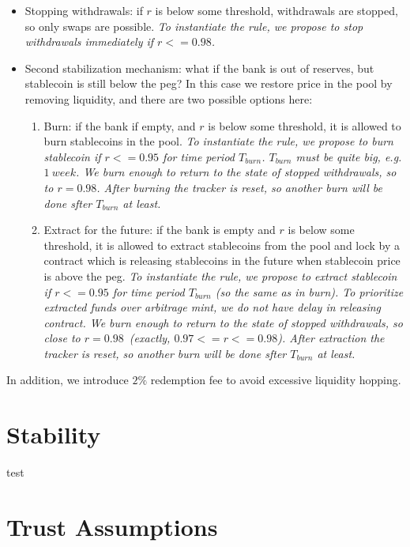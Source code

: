 \documentclass[a4paper,UKenglish,cleveref, autoref, thm-restate]{lipics-v2021}
\newcommand{\sct}{stablecoin}
\begin{document}
\begin{itemize}
   \item{Stopping withdrawals: } if $r$ is below some threshold, withdrawals are stopped, so only swaps are possible.  
   \em{To instantiate the rule, we propose to stop withdrawals immediately if $r <= 0.98$.}

   \item{Second stabilization mechanism: } what if the bank is out of reserves, but \sct{} is still below the peg? In this case we restore price in the pool by removing liquidity, and there are two possible options here:

   \begin{enumerate}
   \item{Burn: } if the bank if empty, and $r$ is below some threshold, it is allowed to burn \sct{}s in the pool. 
   \em{To instantiate the rule, we propose to burn \sct{} if $r <= 0.95$ for time period $T_{burn}$. $T_{burn}$ must be quite big, e.g. $1 {\ week}$. We burn enough to return to the state of stopped withdrawals, so to $r = 0.98$. After burning the tracker is reset, so another burn will be done sfter $T_{burn}$ at least.}

   \item{Extract for the future: } if the bank is empty and $r$ is below some threshold, it is allowed to extract \sct{}s from the pool and lock by a contract which is releasing \sct{}s in the future when \sct{} price is above the peg.
   \em{To instantiate the rule, we propose to extract \sct{} if $r <= 0.95$ for time period $T_{burn}$ (so the same as in burn). 
   To prioritize extracted funds over arbitrage mint, we do not have delay in releasing contract. We burn enough to return to the state of stopped withdrawals, so close to $r = 0.98$~(exactly, $0.97 <= r <= 0.98$). After extraction the tracker is reset, so another burn will be done sfter $T_{burn}$ at least.}
   \end{enumerate}
\end{itemize} 

In addition, we introduce $2\%$ redemption fee to avoid excessive liquidity hopping.

\section{Stability}
\label{sec:stability}

test

\section{Trust Assumptions}
\label{sec:kya}
\end{document}
